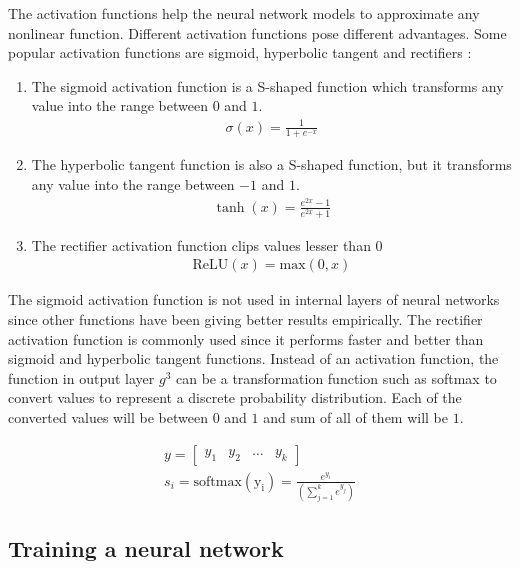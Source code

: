 \documentclass[a4paper, 11pt]{article}
\begin{document}
The activation functions help the neural network models to approximate any nonlinear function. Different activation functions pose different advantages. Some popular activation functions are sigmoid, hyperbolic tangent and rectifiers \parencite{Goldberg2016}:

\begin{enumerate}

\item The sigmoid activation function is a S-shaped function which transforms any value into the range between $0$ and $1$.  
\begin{align*}
\sigma (x) = \frac{1}{1 + e^{-x}}
\end{align*}

\item The hyperbolic tangent function is also a S-shaped function, but it transforms any value into the range between $-1$ and $1$.
\begin{align*}
\tanh (x) = \frac{e^{2x}-1}{e^{2x}+1}
\end{align*}

\item The rectifier activation function clips values lesser than $0$
\begin{align*}
\mathrm{ReLU}(x) = \mathrm{max}(0,x)
\end{align*}

\end{enumerate}

The sigmoid activation function is not used in internal layers of neural networks since other functions have been giving better results empirically. The rectifier activation function is commonly used since it performs faster and better than sigmoid and hyperbolic tangent functions. Instead of an activation function, the function in output layer $g^3$ can be a transformation function such as softmax to convert values to represent a discrete probability distribution. Each of the converted values will be between $0$ and $1$ and sum of all of them will be $1$.

\begin{align*}
y = \begin{bmatrix} y_1 & y_2 & \dots & y_k \end{bmatrix} \\
s_i = \mathrm{softmax(y_i)} = \frac{e^{y_i}}{(\sum_{j=1}^ke^{y_j})}
\end{align*}

\subsection{Training a neural network}
\end{document}
